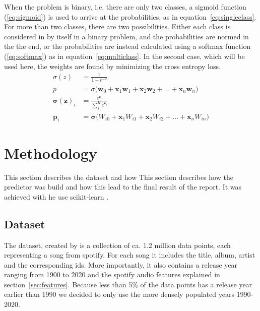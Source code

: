 \documentclass{article}
\begin{document}
When the problem is binary, i.e. there are only two classes, a sigmoid function (\ref{eq:sigmoid}) is used to arrive at the probabilities, as in equation~\ref{eq:singleclass}. For more than two classes, there are two possibilities. Either each class is considered in by itself in a binary problem, and the probabilities are normed in the the end, or the probabilities are instead calculated using a softmax function (\ref{eq:softmax}) as in equation~\ref{eq:multiclass}. In the second case, which will be used here, the weights are found by minimizing the cross entropy loss. 
\begin{align}
  \sigma(z) &= \frac{1}{1+e^{-z}} \label{eq:sigmoid}\\
  p &= \sigma\big(\boldsymbol{w}_0 + \boldsymbol{x}_1\boldsymbol{w}_1+ \boldsymbol{x}_2\boldsymbol{w}_2+ \dots + \boldsymbol{x}_n\boldsymbol{w}_{n}\big) \label{eq:singleclass} \\
  \boldsymbol{\sigma}(\boldsymbol{z})_i &= \frac{e^{\boldsymbol{z}_i}}{\sum_j^K e^{\boldsymbol{z}_j}} \label{eq:softmax} \\
  \boldsymbol{p}_i &= \boldsymbol{\sigma}\Big(W_{i0} + \boldsymbol{x}_1W_{i1}+ \boldsymbol{x}_2W_{i2}+ \dots + \boldsymbol{x}_nW_{in}\Big) \label{eq:multiclass} 
\end{align}



\section{Methodology}
This section describes the dataset and how 
This section describes how the predictor was build and how this lead to the final result of the report. It was achieved with he use scikit-learn \citep{sklearn}.

\subsection{Dataset}\label{sec:dataset}

The dataset, created by \citet{dataset} is a collection of ca. 1.2 million data points, each representing a song from spotify. For each song it includes the title, album, artist and the corresponding ids. More importantly, it also contains a release year ranging from 1900 to 2020 and the spotify audio features explained in section~\ref{sec:features}. Because less than 5\% of the data points has a release year earlier than 1990 we decided to only use the more densely populated years 1990-2020.
\end{document}

